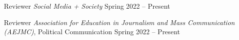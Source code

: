 \begin{cventries}
    \cventry
    {Reviewer} %
    {\textit{Social Media + Society}} %
    {} %
    {Spring 2022 -- Present} %
    {
    }
    
    \cventry
    { Reviewer} %
    {\textit{Association for Education in Journalism and Mass Communication (AEJMC)}, Political Communication } %
    {} %
    {Spring 2022 -- Present} %
    {
    }
\end{cventries}

